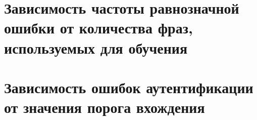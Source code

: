 \documentclass[12pt]{article}
\begin{document}
\section{Зависимость частоты равнозначной ошибки от количества фраз, используемых для обучения}
\begin{figure}[hp!]
\end{figure}

\section{Зависимость ошибок аутентификации от значения порога вхождения}

\begin{figure}[ht!]
\end{figure}
\end{document}
